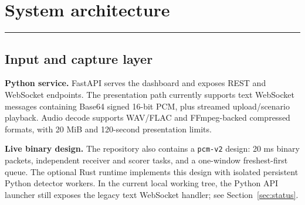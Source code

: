 \documentclass[10pt,a4paper]{article}
\newcommand{\sectionrule}{\vspace{-2mm}\textcolor{blue}{\rule{22mm}{1.2pt}}\vspace{2mm}}
\newcommand{\code}[1]{\texttt{\small #1}}
\begin{document}
\begin{center}
\end{center}

\section{System architecture}
\sectionrule

\subsection{Input and capture layer}

\textbf{Python service.} FastAPI serves the dashboard and exposes REST and WebSocket endpoints. The presentation path currently supports text WebSocket messages containing Base64 signed 16-bit PCM, plus streamed upload/scenario playback. Audio decode supports WAV/FLAC and FFmpeg-backed compressed formats, with 20 MiB and 120-second presentation limits.

\textbf{Live binary design.} The repository also contains a \code{pcm-v2} design: 20 ms binary packets, independent receiver and scorer tasks, and a one-window freshest-first queue. The optional Rust runtime implements this design with isolated persistent Python detector workers. In the current local working tree, the Python API launcher still exposes the legacy text WebSocket handler; see Section~\ref{sec:status}.
\end{document}
